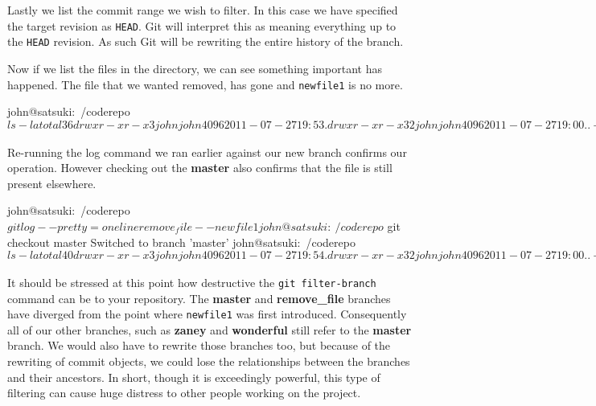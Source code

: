 Lastly we list the commit range we wish to filter.
In this case we have specified the target revision as \texttt{HEAD}.
Git will interpret this as meaning everything up to the \texttt{HEAD} revision.
As such Git will be rewriting the entire history of the branch.

Now if we list the files in the directory, we can see something important has happened.
The file that we wanted removed, has gone and \texttt{newfile1} is no more.

\begin{code}
john@satsuki:~/coderepo$ ls -la
total 36
drwxr-xr-x  3 john john 4096 2011-07-27 19:53 .
drwxr-xr-x 32 john john 4096 2011-07-27 19:00 ..
-rw-r--r--  1 john john   35 2011-07-22 07:15 another_file
-rw-r--r--  1 john john   25 2011-07-22 07:15 cont_dev
drwxrwxr-x  9 john john 4096 2011-07-27 19:53 .git
-rw-r--r--  1 john john   58 2011-07-22 07:15 newfile2
-rw-r--r--  1 john john   45 2011-07-22 07:15 newfile3
-rw-r--r--  1 john john    8 2011-03-31 22:15 temp_file
-rwxrwxr-x  1 john john  114 2011-07-21 21:17 test.sh
john@satsuki:~/coderepo$
\end{code}

Re-running the log command we ran earlier against our new branch confirms our operation.
However checking out the \textbf{master} also confirms that the file is still present elsewhere.

\begin{code}
john@satsuki:~/coderepo$ git log --pretty=oneline remove_file -- newfile1
john@satsuki:~/coderepo$ git checkout master
Switched to branch 'master'
john@satsuki:~/coderepo$ ls -la
total 40
drwxr-xr-x  3 john john 4096 2011-07-27 19:54 .
drwxr-xr-x 32 john john 4096 2011-07-27 19:00 ..
-rw-r--r--  1 john john   35 2011-07-22 07:15 another_file
-rw-r--r--  1 john john   25 2011-07-22 07:15 cont_dev
drwxrwxr-x  9 john john 4096 2011-07-27 19:54 .git
-rw-r--r--  1 john john   69 2011-07-27 19:54 newfile1
-rw-r--r--  1 john john   58 2011-07-22 07:15 newfile2
-rw-r--r--  1 john john   45 2011-07-22 07:15 newfile3
-rw-r--r--  1 john john    8 2011-03-31 22:15 temp_file
-rwxrwxr-x  1 john john  114 2011-07-21 21:17 test.sh
john@satsuki:~/coderepo$
\end{code}

It should be stressed at this point how destructive the \texttt{git filter-branch} command can be to your repository.
The \textbf{master} and \textbf{remove\_file} branches have diverged from the point where \texttt{newfile1} was first introduced.
Consequently all of our other branches, such as \textbf{zaney} and \textbf{wonderful} still refer to the \textbf{master} branch.
We would also have to rewrite those branches too, but because of the rewriting of commit objects, we could lose the relationships between the branches and their ancestors.
In short, though it is exceedingly powerful, this type of filtering can cause huge distress to other people working on the project.


